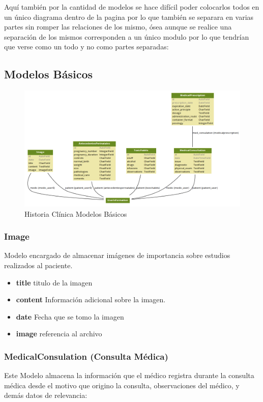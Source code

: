 Aquí también por la cantidad de modelos se hace difícil poder colocarlos todos en un único diagrama dentro de la pagina por lo que también se separara en varias partes sin romper las relaciones de los mismo, ósea aunque se realice una separación de los mismos corresponden a un único modulo por lo que tendrían que verse como un todo y no como partes separadas: \\[0.1cm]


\subsection{Modelos Básicos}

\begin{figure}[H]
    \centering
    \includegraphics[scale=0.4]{resourse/hc1.png}
    \caption{Historia Clínica Modelos Básicos}
    \label{fig:hc3}
\end{figure} 

\subsubsection{Image}
Modelo encargado de almacenar imágenes de importancia sobre estudios realizados al paciente.

\begin{itemize}
    \item \textbf{title} titulo de la imagen
    \item \textbf{content} Información adicional sobre la imagen.
    \item \textbf{date} Fecha que se tomo la imagen
    \item \textbf{image} referencia al archivo 
\end{itemize}

\subsubsection{MedicalConsulation (Consulta Médica)}
Este Modelo almacena la información que el médico registra durante la consulta médica desde el motivo que origino la consulta, observaciones del médico, y demás datos de relevancia:

